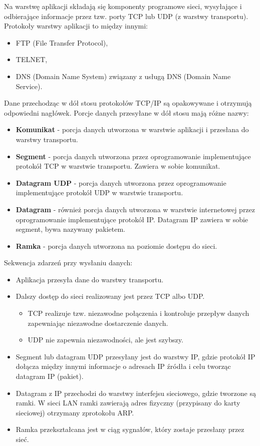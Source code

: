 \documentclass[../main.tex]{subfiles}
\begin{document}
    Na warstwę aplikacji składają się komponenty programowe sieci, wysyłające i odbierające
    informacje przez tzw. porty TCP lub UDP (z warstwy transportu).
    Protokoły warstwy aplikacji to między innymi:
    \begin{itemize}
        \item FTP (File Transfer Protocol),
        \item TELNET,
        \item DNS (Domain Name System) związany z usługą DNS (Domain Name Service).
    \end{itemize}


    Dane przechodząc w dół stosu protokołów TCP/IP są opakowywane i otrzymują
    odpowiedni nagłówek. Porcje danych przesyłane w dół stosu mają różne
    nazwy:
    \begin{itemize}
        \item \textbf{Komunikat} - porcja danych utworzona w warstwie aplikacji i przesłana do warstwy transportu.
        \item \textbf{Segment} - porcja danych utworzona przez oprogramowanie implementujące protokół TCP w warstwie transportu. Zawiera w sobie komunikat.
        \item \textbf{Datagram UDP} - porcja danych utworzona przez oprogramowanie implementujące protokół UDP w warstwie transportu.
        \item \textbf{Datagram} - również porcja danych utworzona w warstwie internetowej przez oprogramowanie implementujące protokół IP. Datagram IP zawiera w sobie segment, bywa nazywany pakietem.
        \item \textbf{Ramka} - porcja danych utworzona na poziomie dostępu do sieci.
    \end{itemize}

    Sekwencja zdarzeń przy wysłaniu danych:
    \begin{itemize}
        \item Aplikacja przesyła dane do warstwy transportu.
        \item Dalszy dostęp do sieci realizowany jest przez TCP albo UDP.
        \begin{itemize}
            \item TCP realizuje tzw. niezawodne połączenia i kontroluje przepływ danych zapewniając niezawodne dostarczenie danych.
            \item UDP nie zapewnia niezawodności, ale jest szybszy.
        \end{itemize}
        \item Segment lub datagram UDP przesyłany jest do warstwy IP, gdzie protokół IP dołącza między innymi informacje o adresach IP źródła i celu tworząc datagram IP (pakiet).
        \item Datagram z IP przechodzi do warstwy interfejsu sieciowego, gdzie tworzone są ramki. W sieci LAN ramki zawierają adres fizyczny (przypisany do karty sieciowej) otrzymany zprotokołu ARP.
        \item Ramka przekształcana jest w ciąg sygnałów, który zostaje przesłany przez sieć.
    \end{itemize}
\end{document}
